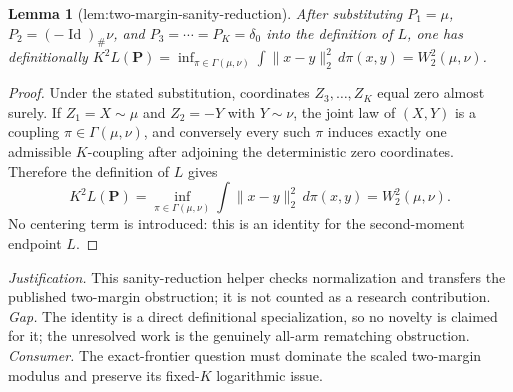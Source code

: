 \documentclass{article}
\newtheorem{lemma}{Lemma}
\begin{document}
\begin{lemma}[lem:two-margin-sanity-reduction]\label{lem:two-margin-sanity-reduction}
After substituting \(P_1=\mu\), \(P_2=(-\operatorname{Id})_{\#}\nu\), and \(P_3=\cdots=P_K=\delta_0\) into the definition of \(L\), one has definitionally \(K^2L(\mathbf P)=\inf_{\pi\in\Gamma(\mu,\nu)}\int\|x-y\|_2^2\,d\pi(x,y)=W_2^2(\mu,\nu)\).
\end{lemma}
\begin{proof}
Under the stated substitution, coordinates \(Z_3,\ldots,Z_K\) equal zero almost surely. If \(Z_1=X\sim\mu\) and \(Z_2=-Y\) with \(Y\sim\nu\), the joint law of \((X,Y)\) is a coupling \(\pi\in\Gamma(\mu,\nu)\), and conversely every such \(\pi\) induces exactly one admissible \(K\)-coupling after adjoining the deterministic zero coordinates. Therefore the definition of \(L\) gives
\[
K^2L(\mathbf P)
=\inf_{\pi\in\Gamma(\mu,\nu)}\int\|x-y\|_2^2\,d\pi(x,y)
=W_2^2(\mu,\nu).
\]
No centering term is introduced: this is an identity for the second-moment endpoint \(L\).
\end{proof}
\par\smallskip\noindent \textit{Justification.} This sanity-reduction helper checks normalization and transfers the published two-margin obstruction; it is not counted as a research contribution. \textit{Gap.} The identity is a direct definitional specialization, so no novelty is claimed for it; the unresolved work is the genuinely all-arm rematching obstruction. \textit{Consumer.} The exact-frontier question must dominate the scaled two-margin modulus and preserve its fixed-\(K\) logarithmic issue.
\end{document}
